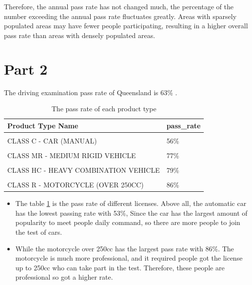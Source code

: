 \documentclass[11pt,a4paper,]{article}
\begin{document}
Therefore, the annual pass rate has not changed much, the percentage of the number exceeding the annual pass rate fluctuates greatly. Areas with sparsely populated areas may have fewer people participating, resulting in a higher overall pass rate than areas with densely populated areas.

\section*{Part 2}

The driving examination pass rate of Queensland is 63\% .

\begin{table}[!h]

\caption{\label{tab:passrate}The pass rate of each product type}
\centering
\begin{tabular}[t]{ll}
\toprule
Product Type Name & pass\_rate\\
\midrule
\cellcolor{gray!6}{CLASS CA - CAR (AUTOMATIC)} & \cellcolor{gray!6}{53\%}\\
CLASS C - CAR (MANUAL) & 56\%\\
\cellcolor{gray!6}{CLASS HR - HEAVY RIGID VEHICLE} & \cellcolor{gray!6}{70\%}\\
CLASS MR - MEDIUM RIGID VEHICLE & 77\%\\
\cellcolor{gray!6}{CLASS RE - MOTORCYCLE (UP TO 250CC} & \cellcolor{gray!6}{77\%}\\
\addlinespace
CLASS HC - HEAVY COMBINATION VEHICLE & 79\%\\
\cellcolor{gray!6}{CLASS LR - LIGHT RIGID VEHICLE} & \cellcolor{gray!6}{83\%}\\
CLASS R - MOTORCYCLE (OVER 250CC) & 86\%\\
\bottomrule
\end{tabular}
\end{table}

\begin{itemize}
\item
  The table \ref{tab:passrate} is the pass rate of different licenses. Above all, the automatic car has the lowest passing rate with 53\%, Since the car has the largest amount of popularity to meet people daily command, so there are more people to join the test of cars.
\item
  While the motorcycle over 250cc has the largest pass rate with 86\%. The motorcycle is much more professional, and it required people got the license up to 250cc who can take part in the test. Therefore, these people are professional so got a higher rate.
\end{itemize}
\end{document}

